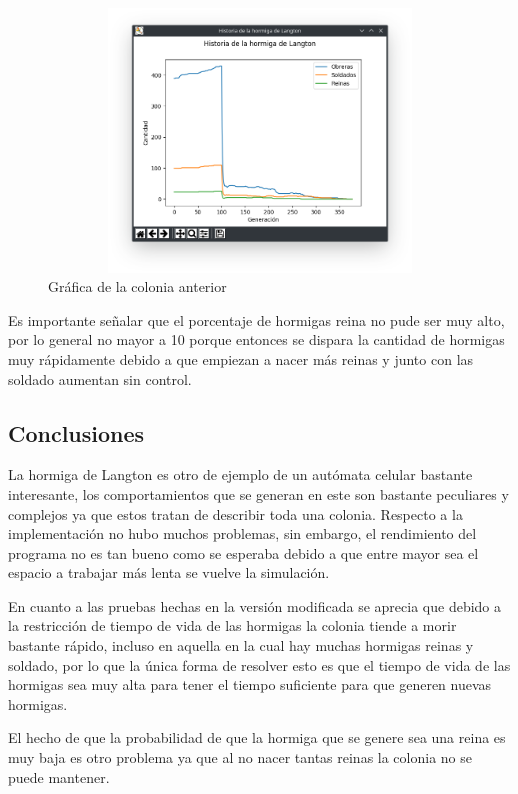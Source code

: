 \begin{figure}[H]
\begin{center}
 \includegraphics[width=12cm, height=7cm]{img/modificado3grafica.png}
 \caption{Gráfica de la colonia anterior}
 \label{fig:modificado3grafica}
\end{center}
\end{figure}

Es importante señalar que el porcentaje de hormigas reina no pude ser muy alto, por lo general no mayor a 10 porque entonces se dispara la cantidad de hormigas muy rápidamente debido a que empiezan a nacer más reinas y junto con las soldado aumentan sin control.

\subsection{Conclusiones}
La hormiga de Langton es otro de ejemplo de un autómata celular bastante interesante, los comportamientos que se generan en este son bastante peculiares y complejos ya que estos tratan de describir toda una colonia. Respecto a la implementación no hubo muchos problemas, sin embargo, el rendimiento del programa no es tan bueno como se esperaba debido a que entre mayor sea el espacio a trabajar más lenta se vuelve la simulación.

En cuanto a las pruebas hechas en la versión modificada se aprecia que debido a la restricción de tiempo de vida de las hormigas la colonia tiende a morir bastante rápido, incluso en aquella en la cual hay muchas hormigas reinas y soldado, por lo que la única forma de resolver esto es que el tiempo de vida de las hormigas sea muy alta para tener el tiempo suficiente para que generen nuevas hormigas. 

El hecho de que la probabilidad de que la hormiga que se genere sea una reina es muy baja es otro problema ya que al no nacer tantas reinas la colonia no se puede mantener.
